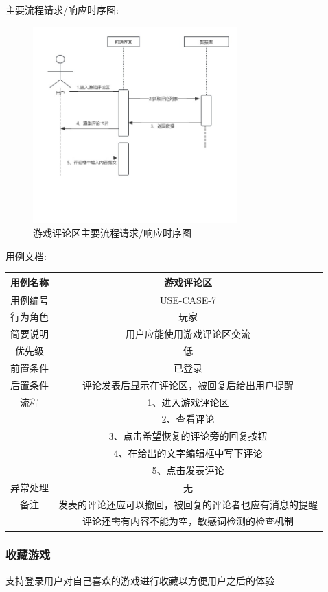 \documentclass[12pt]{ctexart} %
\begin{document}
主要流程请求/响应时序图:
\begin{figure}[h]
  \centering
  \includegraphics[width=0.7\textwidth]{yongli7.jpg}
  \caption{游戏评论区主要流程请求/响应时序图}
\end{figure}
用例文档:

\begin{tabular}{|c|c|}
  \hline
  用例名称& 游戏评论区\\
  \hline
  用例编号 & USE-CASE-7\\
  \hline
  行为角色 & 玩家\\
  \hline
  简要说明 & 用户应能使用游戏评论区交流\\
  \hline
  优先级 & 低\\
  \hline
  前置条件 & 已登录\\
  \hline
  后置条件 & 评论发表后显示在评论区，被回复后给出用户提醒\\
  \hline
  流程 & 1、进入游戏评论区\\
      &  2、查看评论\\
      &  3、点击希望恢复的评论旁的回复按钮\\
      &  4、在给出的文字编辑框中写下评论\\
      &  5、点击发表评论\\
  \hline
  异常处理 & 无\\
  \hline
  备注 & 发表的评论还应可以撤回，被回复的评论者也应有消息的提醒\\
       & 评论还需有内容不能为空，敏感词检测的检查机制\\
  \hline
\end{tabular}

\subsubsection{收藏游戏}
支持登录用户对自己喜欢的游戏进行收藏以方便用户之后的体验
\end{document}
